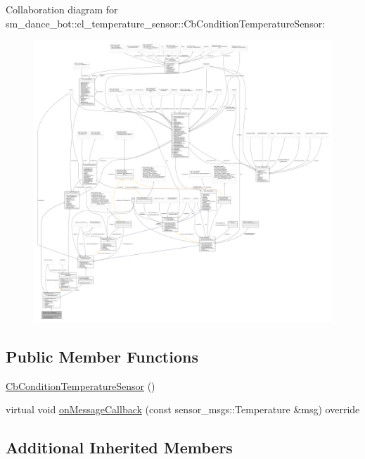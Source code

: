 Collaboration diagram for sm\+\_\+dance\+\_\+bot\+:\+:cl\+\_\+temperature\+\_\+sensor\+:\+:Cb\+Condition\+Temperature\+Sensor\+:
\nopagebreak
\begin{figure}[H]
\begin{center}
\leavevmode
\includegraphics[width=350pt]{classsm__dance__bot_1_1cl__temperature__sensor_1_1CbConditionTemperatureSensor__coll__graph}
\end{center}
\end{figure}
\subsection*{Public Member Functions}
\begin{DoxyCompactItemize}
\item 
\hyperlink{classsm__dance__bot_1_1cl__temperature__sensor_1_1CbConditionTemperatureSensor_a9fd6f64ddff322bf3a8b8f0e3783c910}{Cb\+Condition\+Temperature\+Sensor} ()
\item 
virtual void \hyperlink{classsm__dance__bot_1_1cl__temperature__sensor_1_1CbConditionTemperatureSensor_a4794ea051f9b98ed991b125d1a8a55b5}{on\+Message\+Callback} (const sensor\+\_\+msgs\+::\+Temperature \&msg) override
\end{DoxyCompactItemize}
\subsection*{Additional Inherited Members}


